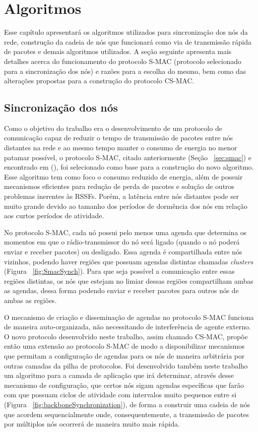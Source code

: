 \section{Algoritmos}

Esse capítulo apresentará os algoritmos utilizados para sincronização dos nós da rede, construção da  cadeia de nós que funcionará como via de transmissão rápida de pacotes e demais algoritmos utilizados. A seção seguinte apresenta mais detalhes acerca do funcionamento do protocolo S-MAC (protocolo selecionado para a sincronização dos nós) e razões para a escolha do mesmo, bem como das alterações propostas para a construção do protocolo CS-MAC.

\subsection{Sincronização dos nós}

Como o objetivo do trabalho era o desenvolvimento de um protocolo de comunicação capaz de reduzir o tempo de transmissão de pacotes entre nós distantes na rede e ao mesmo tempo manter o consumo de energia no menor patamar possível, o protocolo S-MAC, citado anteriormente (Seção ~\ref{sec:smac}) e encontrado em  (\citeyear{ye04}), foi selecionado como base para a construção do novo algoritmo. Esse algoritmo tem como foco o consumo reduzido de energia, além de possuir mecanismos eficientes para redução de perda de pacotes e solução de outros problemas inerentes às RSSFs. Porém, a latência entre nós distantes pode ser muito grande devido ao tamanho dos períodos de dormência dos nós em relação aos curtos períodos de atividade.

No protocolo S-MAC, cada nó possui pelo menos uma agenda que determina os momentos em que o rádio-transmissor do nó será ligado (quando o nó poderá enviar e receber pacotes) ou desligado. Essa agenda é compartilhada entre nós vizinhos, podendo haver regiões que possuam agendas distintas chamadas \emph{clusters} (Figura ~\ref{fig:SmacSynch}). Para que seja possível a comunicação entre essas regiões distintas, os nós que estejam no limiar dessas regiões compartilham ambas as agendas, dessa forma podendo enviar e receber pacotes para outros nós de ambas as regiões.

O mecanismo de criação e disseminação de agendas no protocolo S-MAC funciona de maneira auto-organizada, não necessitando de interferência de agente externo. O novo protocolo desenvolvido neste trabalho, assim chamado CS-MAC, propõe então uma extensão ao protocolo S-MAC de modo a disponibilizar mecanismos que permitam a configuração de agendas para os nós de maneira arbitrária por outras camadas da pilha de protocolos. Foi desenvolvido também neste trabalho um algoritmo para a camada de aplicação que irá determinar, através desse mecanismo de configuração,  que certos nós sigam agendas específicas que farão com que possuam ciclos de atividade com intervalos muito pequenos entre si (Figura ~\ref{fig:backboneSynchronization}), de forma a construir uma cadeia de nós que acordem sequencialmente onde, consequentemente, a transmissão de pacotes por múltiplos nós ocorrerá de maneira muito mais rápida.

